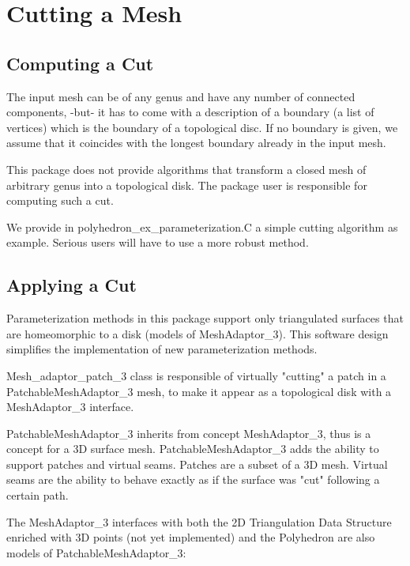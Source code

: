 \section{Cutting a Mesh}

\subsection{Computing a Cut}

The input mesh can be of any genus and have any number of connected components,
-but- it has to come with a description of a boundary (a list of
vertices) which is the boundary of
a topological disc. If no boundary is given, we assume that it
coincides with the longest boundary already in the input mesh.

This package does not provide algorithms that transform
a closed mesh of arbitrary genus into a topological disk.
The package user is responsible for computing such a cut.

We provide in polyhedron\_ex\_parameterization.C a simple cutting algorithm as example.
Serious users will have to use a more robust method.


\subsection{Applying a Cut}

Parameterization methods in this package support only
triangulated surfaces that are homeomorphic to a
disk (models of MeshAdaptor\_3). This software design simplifies the implementation of new
parameterization methods.

Mesh\_adaptor\_patch\_3 class is responsible of virtually "cutting"
a patch in a PatchableMeshAdaptor\_3 mesh, to make it appear as a topological disk
with a MeshAdaptor\_3 interface.

PatchableMeshAdaptor\_3 inherits from concept MeshAdaptor\_3, thus is a concept for a 3D surface mesh.
PatchableMeshAdaptor\_3 adds the ability to support patches and virtual seams. Patches are a subset of a 3D mesh. Virtual seams are the ability to behave exactly as if the surface was "cut" following a certain path.

The MeshAdaptor\_3 interfaces with both the 2D Triangulation Data Structure enriched
with 3D points (not yet implemented) and the Polyhedron are also models of PatchableMeshAdaptor\_3:

  \\


